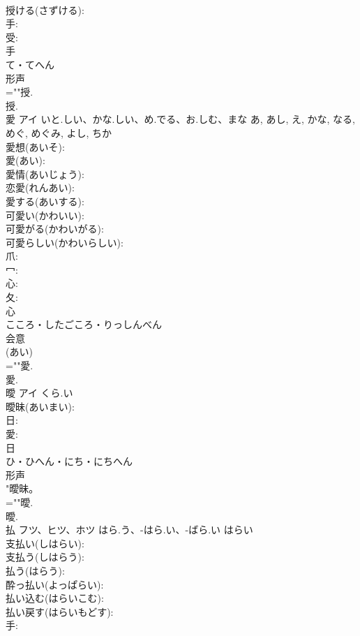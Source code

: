 \documentclass[8pt]{extreport}
\begin{document}
\begin{CJK}{UTF8}{min}
\\	授ける(さずける): 
\\	手: 
\\	受: 
\\	手	
\\	て・てへん	
\\	形声 
\\	=""授.
\\	授.
\\	愛	アイ	いと.しい、かな.しい、め.でる、お.しむ、まな	あ, あし, え, かな, なる, めぐ, めぐみ, よし, ちか	
\\	愛想(あいそ): 
\\	愛(あい): 
\\	愛情(あいじょう): 
\\	恋愛(れんあい): 
\\	愛する(あいする): 
\\	可愛い(かわいい): 
\\	可愛がる(かわいがる): 
\\	可愛らしい(かわいらしい): 
\\	爪: 
\\	冖: 
\\	心: 
\\	夂: 
\\	心	
\\	こころ・したごころ・りっしんべん	
\\	会意 
\\	(あい) 
\\	=""愛.
\\	愛.
\\	曖	アイ	くら.い		
\\	曖昧(あいまい): 
\\	日: 
\\	愛: 
\\	日	
\\	ひ・ひへん・にち・にちへん	
\\	形声 
\\	"曖昧。 
\\	=""曖.
\\	曖.
\\	払	フツ、ヒツ、ホツ	はら.う、-はら.い、-ばら.い	はらい	
\\	支払い(しはらい): 
\\	支払う(しはらう): 
\\	払う(はらう): 
\\	酔っ払い(よっぱらい): 
\\	払い込む(はらいこむ): 
\\	払い戻す(はらいもどす): 
\\	手: 

\end{CJK}
\end{document}
